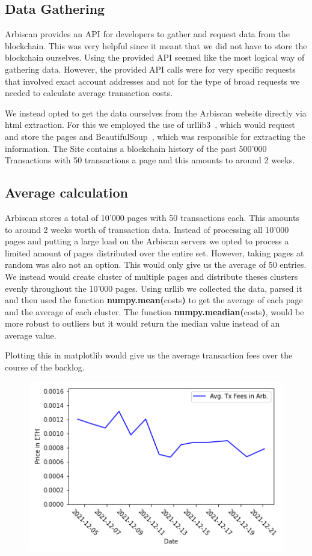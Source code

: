 \documentclass[a4paper,oneside,openright,11pt]{report}
\begin{document}
\subsection{Data Gathering}
	Arbiscan provides an API for developers to gather and request data from the blockchain. 
	This was very helpful since it meant that we did not have to store the blockchain ourselves.
	Using the provided API seemed like the most logical way of gathering data. 
	However, the provided API calls were for very specific 
	requests that involved exact account addresses and not for the type of broad requests we needed 
	to calculate average transaction costs.
	
	We instead opted to get the data ourselves from the Arbiscan website directly via html extraction.
	For this we employed the use of urllib3~\cite{UrlLib3}, which would request and store the pages and 
	BeautifulSoup~\cite{BS}, which was responsible for extracting the information.
	The Site contains a blockchain
	history of the past 500'000 Transactions with 50 transactions a page and this amounts to around 2 weeks. 
	
	\subsection{Average calculation}
	Arbiscan stores a total of 10'000 pages with 50 transactions each. This amounts to around
	2 weeks worth of transaction data. Instead of processing all 10'000 pages and putting a large
	load on the Arbiscan servers we opted to process a limited amount of pages distributed 
	over the entire set. However, taking pages at random was also not an option. This would only 
	give us the average of 50 entries. We instead would create cluster of multiple pages and 
	distribute theses clusters evenly throughout the 10'000 pages.
	Using urllib we collected the data, parsed it and then used the function 
	\textbf{numpy.mean(}costs\textbf{)} to get the average of each page and the average of
	each cluster. The function \textbf{numpy.meadian(}costs\textbf{)}, would be more robust
	to outliers but it would return the median value instead of an average value.
	
	Plotting this in matplotlib would give us the average transaction fees over the course of the backlog.
	\begin{figure}[h]
		\centering
		\includegraphics[scale=0.8]{./Pictures/arb_avg_eth.png}
		\label{fig:Average_Arbitrum_Ether_Fees}
	\end{figure}
	
\end{document}
